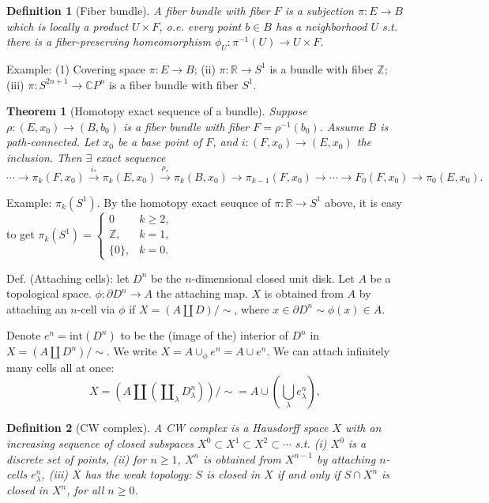 \documentclass{article}
\theoremstyle{mystyle}
\newtheorem*{definition}{Definition}%
\newtheorem*{theorem*}{Theorem}
\theoremstyle{remark}
\numberwithin{equation}{section}
\begin{document}
\begin{definition}[Fiber bundle] A \emph{fiber bundle} with fiber $F$ is a subjection $\pi\colon E\rightarrow B$ which is locally a product $U\times F$, o.e. every point $b\in B$ has a neighborhood $U$ s.t. there is a fiber-preserving homeomorphism $\phi_U\colon \pi^{-1}(U)\rightarrow U\times F$.
\end{definition}

Example: (1) Covering space $\pi\colon E\rightarrow B$; (ii) $\pi\colon \mathbb{R}\rightarrow S^1$ is a bundle with fiber $\mathbb{Z}$; (iii) $\pi\colon S^{2n+1}\rightarrow \mathbb{C}P^n$ is a fiber bundle with fiber $S^1$.


\begin{theorem*}[Homotopy exact sequence of a bundle]
Suppose $\rho\colon (E,x_0)\rightarrow (B,b_0)$ is a fiber bundle with fiber $F = \rho^{-1}(b_0)$. Assume $B$ is path-connected. Let $x_0$ be a base point of $F$, and $i\colon (F,x_0)\rightarrow (E,x_0)$ the inclusion. Then $\exists$ exact sequence
$$
\cdots \rightarrow \pi_k(F,x_0)\xrightarrow{i_*}\pi_k(E,x_0)
\xrightarrow{\rho_*}\pi_k(B,x_0)
\rightarrow\pi_{k-1}(F,x_0)\rightarrow\cdots\rightarrow F_0(F,x_0)\rightarrow \pi_0(E,x_0).
$$
\end{theorem*}

Example: $\pi_k(S^1)$. By the homotopy exact seuqnce of $\pi\colon \mathbb{R}\rightarrow S^1$ above, it is easy to get $\pi_k(S^1) = \left\{\begin{array}{ll} 0 & k\geq 2,\\\mathbb{Z},&k=1,\\
\{0\}, & k = 0.\end{array}\right.$

Def. (Attaching cells): let $D^n$ be the $n$-dimensional closed unit disk. Let $A$ be a topological space. $\phi\colon \partial D^n\rightarrow A$ the attaching map. $X$ is obtained from $A$ by attaching an $n$-cell via $\phi$ if $X = (A\amalg D)/\sim$, where $x\in \partial D^n\sim \phi(x) \in A$. 

Denote $e^n = \text{int}(D^n)$ to be the (image of the) interior of $D^n$ in $X=(A\amalg D^n)/\sim$. We write $X = A\cup_\phi e^n = A\cup e^n$. We can attach infinitely many cells all at once:
$$X = \left(A\amalg(\amalg_\lambda D^n_\lambda)\right)/\sim = A \cup \left(\bigcup\limits_\lambda e^n_\lambda\right),$$

\begin{definition}[CW complex] A \emph{CW complex} is a Hausdorff space $X$ with an increasing sequence of closed subspaces $X^0\subset X^1\subset X^2\subset \cdots$ s.t.  (i) $X^0$ is a discrete set of points, (ii) for $n\geq 1$, $X^n$ is obtained from $X^{n-1}$ by attaching $n$-cells $e^n_\lambda$, (iii) $X$ has the \emph{weak} topology: $S$ is closed in $X$ if and only if $S\cap X^n$ is closed in $X^n$, for all $n\geq 0$.
\end{definition}
\end{document}

